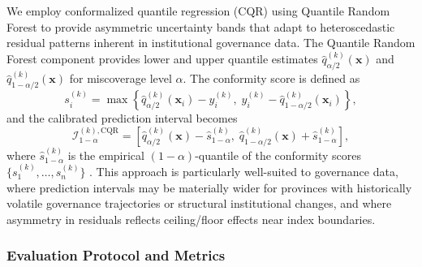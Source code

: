 \documentclass[12pt,a4paper]{article}
\begin{document}
We employ conformalized quantile regression (CQR) using Quantile Random Forest to provide asymmetric uncertainty bands that adapt to heteroscedastic residual patterns inherent in institutional governance data. The Quantile Random Forest component provides lower and upper quantile estimates $\widehat{q}_{\alpha/2}^{(k)}(\mathbf{x})$ and $\widehat{q}_{1-\alpha/2}^{(k)}(\mathbf{x})$ for miscoverage level $\alpha$. The conformity score is defined as
\begin{equation}
s_i^{(k)} = \max \left\{ \widehat{q}_{\alpha/2}^{(k)}(\mathbf{x}_i) - y_i^{(k)}, \; y_i^{(k)} - \widehat{q}_{1-\alpha/2}^{(k)}(\mathbf{x}_i) \right\},
\end{equation}
and the calibrated prediction interval becomes
\begin{equation}
\mathcal{I}_{1-\alpha}^{(k),\text{CQR}} = \left[ \widehat{q}_{\alpha/2}^{(k)}(\mathbf{x}) - \widehat{s}_{1-\alpha}^{(k)}, \; \widehat{q}_{1-\alpha/2}^{(k)}(\mathbf{x}) + \widehat{s}_{1-\alpha}^{(k)} \right],
\end{equation}
where $\widehat{s}_{1-\alpha}^{(k)}$ is the empirical $(1-\alpha)$-quantile of the conformity scores $\{s_1^{(k)}, \ldots, s_n^{(k)}\}$ \citep{Romano2019}. This approach is particularly well-suited to governance data, where prediction intervals may be materially wider for provinces with historically volatile governance trajectories or structural institutional changes, and where asymmetry in residuals reflects ceiling/floor effects near index boundaries.

\subsubsection{Evaluation Protocol and Metrics}
\end{document}
